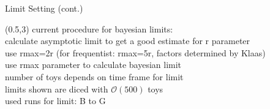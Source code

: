 \begin{frame}{Limit Setting (cont.)}
        \begin{textblock}{15}(0.5,3) %
            current procedure for bayesian limits:\\[1cm]
            calculate asymptotic limit to get a good estimate for r parameter\\[0.5cm]
            use rmax=2r (for frequentist: rmax=5r, factors determined by Klaas)\\[0.5cm]
            use rmax parameter to calculate bayesian limit\\[0.5cm]
            number of toys depends on time frame for limit\\[0.5cm]
            limits shown are diced with $\mathcal{O}(500)$ toys\\
            used runs for limit: B to G
        \end{textblock}
\end{frame}